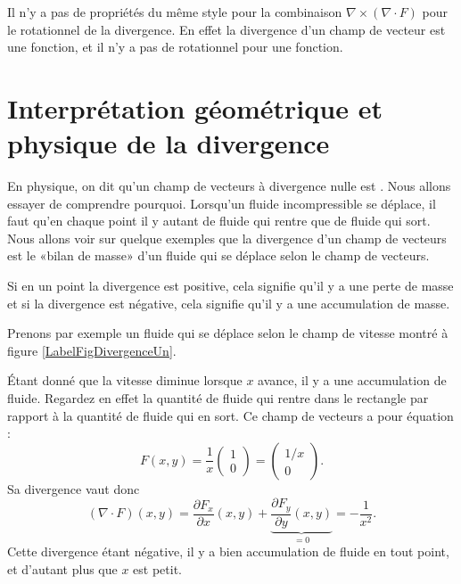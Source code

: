 \begin{remark}
    Il n'y a pas de propriétés du même style pour la combinaison $\nabla\times(\nabla\cdot F)$ pour le rotationnel de la divergence. En effet la divergence d'un champ de vecteur est une fonction, et il n'y a pas de rotationnel pour une fonction.
\end{remark}

\section[Interprétation de la divergence]{Interprétation géométrique et physique de la divergence}


En physique, on dit qu'un champ de vecteurs à divergence nulle est . Nous allons essayer de comprendre pourquoi. Lorsqu'un fluide incompressible se déplace, il faut qu'en chaque point il y autant de fluide qui rentre que de fluide qui sort. Nous allons voir sur quelque exemples que la divergence d'un champ de vecteurs est le «bilan de masse» d'un fluide qui se déplace selon le champ de vecteurs.

Si en un point la divergence est positive, cela signifie qu'il y a une perte de masse et si la divergence est négative, cela signifie qu'il y a une accumulation de masse.

Prenons par exemple un fluide qui se déplace selon le champ de vitesse montré à figure \ref{LabelFigDivergenceUn}.
\newcommand{\CaptionFigDivergenceUn}{Le champ de vecteurs $F(x,y)=\frac{1}{ x }(1,0)$.}


Étant donné que la vitesse diminue lorsque $x$ avance, il y a une accumulation de fluide. Regardez en effet la quantité de fluide qui rentre dans le rectangle par rapport à la quantité de fluide qui en sort. Ce champ de vecteurs a pour équation :
\begin{equation}
    F(x,y)=\frac{1}{ x }\begin{pmatrix}
        1    \\ 
        0    
    \end{pmatrix}=\begin{pmatrix}
        1/x    \\ 
        0    
    \end{pmatrix}.
\end{equation}
Sa divergence vaut donc
\begin{equation}
    (\nabla\cdot F)(x,y)=\frac{ \partial F_x }{ \partial x }(x,y)+\underbrace{\frac{ \partial F_y }{ \partial y }(x,y)}_{=0}=-\frac{1}{ x^2 }.
\end{equation}
Cette divergence étant négative, il y a bien accumulation de fluide en tout point, et d'autant plus que $x$ est petit.


